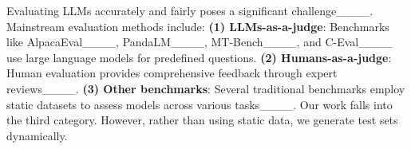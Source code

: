 
Evaluating LLMs accurately and fairly poses a significant challenge____. Mainstream evaluation methods include: \textbf{(1) LLMs-as-a-judge}: Benchmarks like AlpacaEval____, PandaLM____, MT-Bench____, and C-Eval____ use large language models for predefined questions.
\textbf{(2) Humans-as-a-judge}: Human evaluation provides comprehensive feedback through expert reviews____. \textbf{(3) Other benchmarks}: Several traditional benchmarks employ static datasets to assess models across various tasks____. 
Our work falls into the third category. However, rather than using static data, we generate test sets dynamically.


